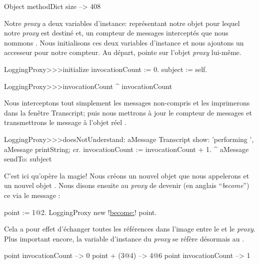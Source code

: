 \documentclass[a4paper,10pt,twoside]{book}
\begin{document}
\begin{code}{}
Object methodDict size --> 408
\end{code}

Notre \emph{proxy} a deux variables d'instance:
 représentant notre objet pour lequel notre \emph{proxy} est destiné et, un compteur de messages interceptés que nous nommons .
Nous initialisons ces deux variables d'instance et nous ajoutons un accesseur pour notre compteur.
Au départ,  pointe sur l'objet \emph{proxy} lui-même.

\begin{code}{}
LoggingProxy>>>initialize
	invocationCount := 0.
	subject := self.
\end{code}

\begin{code}{}
LoggingProxy>>>invocationCount
	^ invocationCount
\end{code}

Nous interceptons tout simplement les messages non-compris et les imprimerons dans la fenêtre Transcript; puis nous mettrons à jour le compteur de messages et transmettrons le message à l'objet réel .

\begin{code}{}
LoggingProxy>>>doesNotUnderstand: aMessage 
	Transcript show: 'performing ', aMessage printString; cr.
	invocationCount := invocationCount + 1.
	^ aMessage sendTo: subject
\end{code}

C'est ici qu'opère la magie!
Nous créons un nouvel objet  que nous appelerons  et un nouvel objet . Nous disons ensuite au \emph{proxy} de devenir (en anglais ``\emph{become}'') ce  via le message \mbox{:}
\begin{code}{}
point := 1@2.
LoggingProxy new !\underline{become:}! point.
\end{code}

Cela a pour effet d'échanger toutes les références dans l'image entre le  et le \emph{proxy}. 
Plus important encore, la variable d'instance  du \emph{proxy} se réfère désormais au .

\begin{code}{}
point invocationCount --> 0
point + (3@4)             --> 4@6
point invocationCount --> 1
\end{code}
\end{document}
